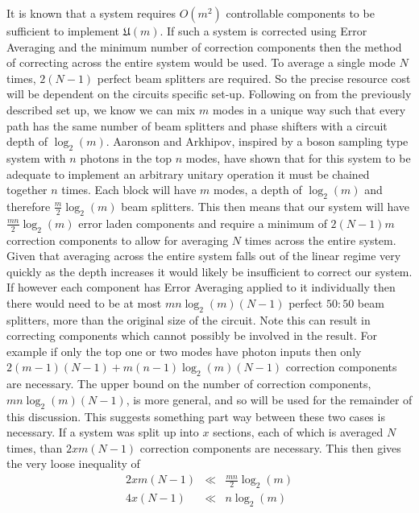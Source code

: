 \documentclass[aps,pra,twocolumn,superscriptaddress,numerical,floatfix]{revtex4-1}
\begin{document}
It is known \cite{reck} that a system requires $O\left(m^{2}\right)$ controllable components to be sufficient to implement $\mathfrak{U}\left(m\right)$. If such a system is corrected using Error Averaging and the minimum number of correction components then the method of correcting across the entire system would be used. To average a single mode $N$ times, $2\left(N-1\right)$ perfect beam splitters are required. So the precise resource cost will be dependent on the circuits specific set-up. Following on from the previously described set up, we know we can mix $m$ modes in a unique way such that every path has the same number of beam splitters and phase shifters with a circuit depth of $\log_{2}\left(m\right)$. Aaronson and Arkhipov, inspired by a boson sampling type system with $n$ photons in the top $n$ modes, have shown \cite{Boson} that for this system to be adequate to implement an arbitrary unitary operation it must be chained together $n$ times. Each block will have $m$ modes, a depth of $\log_{2}\left(m\right)$ and therefore $\frac{m}{2}\log_{2}\left(m\right)$ beam splitters. This then means that our system will have $\frac{mn}{2}\log_{2}\left(m\right)$ error laden components and require a minimum of $2\left(N-1\right)m$ correction components to allow for averaging $N$ times across the entire system. Given that averaging across the entire system falls out of the linear regime very quickly as the depth increases it would likely be insufficient to correct our system. If however each component has Error Averaging applied to it individually then there would need to be at most $mn\log_{2}\left(m\right)\left(N-1\right)$ perfect $50:50$ beam splitters, more than the original size of the circuit. Note this can result in correcting components which cannot possibly be involved in the result. For example if only the top one or two modes have photon inputs then only $2\left(m-1\right)\left(N-1\right)+m\left(n-1\right)\log_{2}\left(m\right)\left(N-1\right)$ correction components are necessary. The upper bound on the number of correction components, $mn\log_{2}\left(m\right)\left(N-1\right)$, is more general, and so will be used for the remainder of this discussion. This suggests something part way between these two cases is necessary. If a system was split up into $x$ sections, each of which is averaged $N$ times, than $2xm\left(N-1\right)$ correction components are necessary. This then gives the very loose inequality of
\begin{eqnarray}
2xm\left(N-1\right) & \ll & \frac{mn}{2}\log_{2}\left(m\right)\nonumber \\
4x\left(N-1\right) & \ll & n\log_{2}\left(m\right)\label{eq:veryLooseInequality}
\end{eqnarray}
\end{document}

